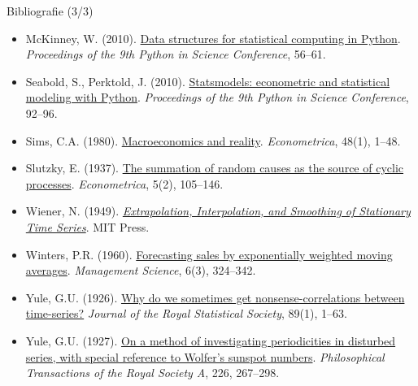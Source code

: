 \begin{frame}{Bibliografie (3/3)}
\itemsize{\scriptsize}
\begin{itemize}
    \item McKinney, W. (2010). \href{https://doi.org/10.25080/Majora-92bf1922-00a}{Data structures for statistical computing in Python}. \emph{Proceedings of the 9th Python in Science Conference}, 56--61.
    \item Seabold, S., Perktold, J. (2010). \href{https://doi.org/10.25080/Majora-92bf1922-011}{Statsmodels: econometric and statistical modeling with Python}. \emph{Proceedings of the 9th Python in Science Conference}, 92--96.
    \item Sims, C.A. (1980). \href{https://doi.org/10.2307/1912017}{Macroeconomics and reality}. \emph{Econometrica}, 48(1), 1--48.
    \item Slutzky, E. (1937). \href{https://doi.org/10.2307/1907241}{The summation of random causes as the source of cyclic processes}. \emph{Econometrica}, 5(2), 105--146.
    \item Wiener, N. (1949). \href{https://doi.org/10.7551/mitpress/2946.001.0001}{\emph{Extrapolation, Interpolation, and Smoothing of Stationary Time Series}}. MIT Press.
    \item Winters, P.R. (1960). \href{https://doi.org/10.1287/mnsc.6.3.324}{Forecasting sales by exponentially weighted moving averages}. \emph{Management Science}, 6(3), 324--342.
    \item Yule, G.U. (1926). \href{https://doi.org/10.2307/2341482}{Why do we sometimes get nonsense-correlations between time-series?} \emph{Journal of the Royal Statistical Society}, 89(1), 1--63.
    \item Yule, G.U. (1927). \href{https://doi.org/10.1098/rsta.1927.0007}{On a method of investigating periodicities in disturbed series, with special reference to Wolfer's sunspot numbers}. \emph{Philosophical Transactions of the Royal Society A}, 226, 267--298.
\end{itemize}
\end{frame}



